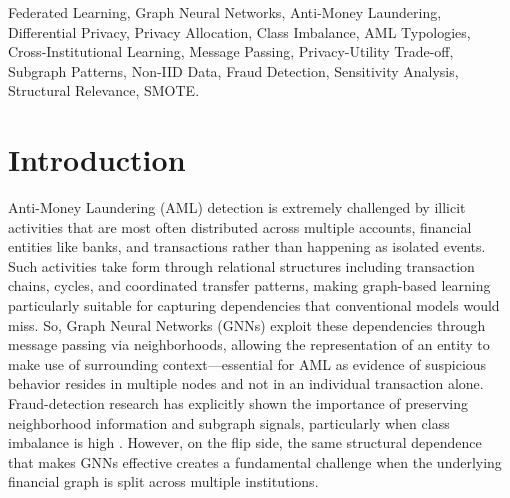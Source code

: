 \documentclass[conference]{IEEEtran}
\begin{document}
\begin{abstract}
Furthermore, Individualized-DP-SGD experiences severe Signal Dilution ($\text{ROC-AUC} = 0.7837, \text{AP} = 0.008267$), proving that unstratified Poisson sampling leaves $99.5\%$ of batches devoid of rare positive signals, allowing accumulated Gaussian noise to drown out learning. In parallel, TA-DPFL Policy D confirms Hypothesis 2 ($\text{ROC-AUC} = 0.7774, \text{AP} = 0.007914$), demonstrating that enforcing a stricter privacy target on the majority background class ($\bar{\varepsilon}_{\text{BG}} = 2.0$) forces the global noise multiplier to $\sigma = 1.15$, imposing an inescapable utility tax across all network weights. Finally, we formulate the RDP Privacy Conservation Law governing rare-stratum exposure under worst-case caps.
\end{abstract}

\begin{IEEEkeywords}
Federated Learning, Graph Neural Networks, Anti-Money Laundering, Differential Privacy, Privacy Allocation, Class Imbalance, AML Typologies, Cross-Institutional Learning, Message Passing, Privacy-Utility Trade-off, Subgraph Patterns, Non-IID Data, Fraud Detection, Sensitivity Analysis, Structural Relevance, SMOTE.
\end{IEEEkeywords}

\section{Introduction}
Anti-Money Laundering (AML) detection is extremely challenged by illicit activities that are most often distributed across multiple accounts, financial entities like banks, and transactions rather than happening as isolated events. Such activities take form through relational structures including transaction chains, cycles, and coordinated transfer patterns, making graph-based learning particularly suitable for capturing dependencies that conventional models would miss. So, Graph Neural Networks (GNNs) exploit these dependencies through message passing via neighborhoods, allowing the representation of an entity to make use of surrounding context---essential for AML as evidence of suspicious behavior resides in multiple nodes and not in an individual transaction alone. Fraud-detection research has explicitly shown the importance of preserving neighborhood information and subgraph signals, particularly when class imbalance is high \cite{b1}. However, on the flip side, the same structural dependence that makes GNNs effective creates a fundamental challenge when the underlying financial graph is split across multiple institutions.
\end{document}
